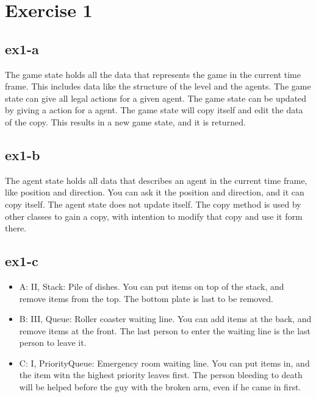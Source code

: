 \section{Exercise 1}
\label{sec:ex1}
\subsection{ex1-a}
The game state holds all the data that represents the game in the current time frame. 
This includes data like the structure of the level and the agents. The game state can give all legal actions for a given agent.
The game state can be updated by giving a action for a agent. The game state will copy itself and edit the data of the copy. This results in a new game state, and it is returned.
\subsection{ex1-b}
The agent state holds all data that describes an agent in the current time frame, like position and direction.
You can ask it the position and direction, and it can copy itself. The agent state does not update itself. The copy method is used by other classes to gain a copy, with intention to modify that copy and use it form there.
\subsection{ex1-c}
\begin{itemize}
\item A: II, Stack: Pile of dishes. You can put items on top of the stack, and remove items from the top. The bottom plate is last to be removed.
\item B: III, Queue: Roller coaster waiting line. You can add items at the back, and remove items at the front. The last person to enter the waiting line is the last person to leave it.
\item C: I, PriorityQueue: Emergency room waiting line. You can put items in, and the item witn the highest priority leaves first. The person bleeding to death will be helped before the guy with the broken arm, even if he came in first.
\end{itemize}

